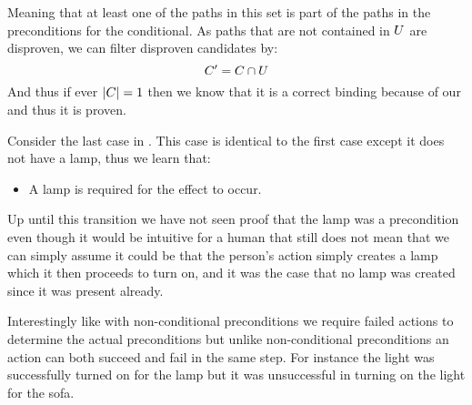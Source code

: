 \documentclass[\master/Master.tex]{subfiles}
\begin{document}
Meaning that at least one of the paths in this set is part of the paths in the preconditions for the conditional. As paths that are not contained in $U$ are disproven, we can filter disproven candidates by:
\begin{equation}
    C' = C \cap U
\end{equation}
And thus if ever $|C| = 1$ then we know that it is a correct binding because of our  and thus it is proven.

\begin{example}\label{ex:ca:light-on-3}
    Consider the last case in . This case is identical to the first case except it does not have a lamp, thus we learn that:
    \begin{itemize}
        \item A lamp is required for the effect to occur.
    \end{itemize}
    Up until this transition we have not seen proof that the lamp was a precondition even though it would be intuitive for a human that still does not mean that we can simply assume it could be that the person's action simply creates a lamp which it then proceeds to turn on, and it was the case that no lamp was created since it was present already.
    
    Interestingly like with non-conditional preconditions we require failed actions to determine the actual preconditions but unlike non-conditional preconditions an action can both succeed and fail in the same step. For instance the light was successfully turned on for the lamp but it was unsuccessful in turning on the light for the sofa.

\end{example}
\end{document}
